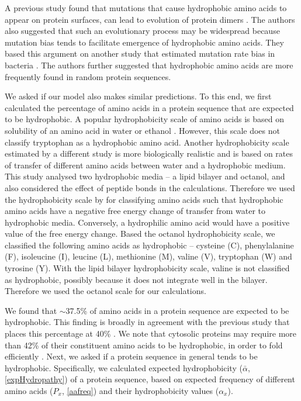 \documentclass[12pt,a4paper]{article}
\begin{document}
A previous study found that mutations that cause hydrophobic amino acids to appear on protein surfaces, can lead to evolution of protein dimers \citep{hydrophobicRatchet}. The authors also suggested that such an evolutionary process may be widespread because mutation bias tends to facilitate emergence of hydrophobic amino acids. They based this argument on another study that estimated mutation rate bias in bacteria \citep{bacteriaMutbias}. The authors \citep{hydrophobicRatchet} further suggested that hydrophobic amino acids are more frequently found in random protein sequences. 

We asked if our model also makes similar predictions. To this end, we first calculated the percentage of amino acids in a protein sequence that are expected to be hydrophobic. A popular hydrophobicity scale of amino acids is based on solubility of an amino acid in water or ethanol \citep{hydropathy}. However, this scale does not classify tryptophan as a hydrophobic amino acid. Another hydrophobicity scale estimated by a different study \citep{WWhydropathy} is more biologically realistic and is based on rates of transfer of different amino acids between water and a hydrophobic medium. This study analysed two hydrophobic media -- a lipid bilayer and octanol, and also considered the effect of peptide bonds in the calculations. Therefore we used the hydrophobicity scale by \cite{WWhydropathy} for classifying amino acids such that hydrophobic amino acids have a negative free energy change of transfer from water to hydrophobic media. Conversely, a hydrophilic amino acid would have a positive value of the free energy change. Based the octanol hydrophobicity scale, we classified the following amino acids as hydrophobic -- cysteine (C), phenylalanine (F), isoleucine (I), leucine (L), methionine (M), valine (V), tryptophan (W) and tyrosine (Y). With the lipid bilayer hydrophobicity scale, valine is not classified as hydrophobic, possibly because it does not integrate well in the bilayer. Therefore we used the octanol scale for our calculations.

We found that $\sim$37.5\% of amino acids in a protein sequence are expected to be hydrophobic. This finding is broadly in agreement with the previous study that places this percentage at 40\% \citep{hydrophobicRatchet}. We note that cytosolic proteins may require more than 42\% of their constituent amino acids to be hydrophobic, in order to fold efficiently \citep{Dill1985}. Next, we asked if a protein sequence in general tends to be hydrophobic. Specifically, we calculated expected hydrophobicity ($\bar{\alpha}$, \autoref{expHydropathy}) of a protein sequence, based on expected frequency of different amino acids ($P_x$, \autoref{aafreq}) and their hydrophobicity values ($\alpha_x$). 
\end{document}
